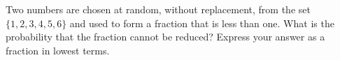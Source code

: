 Two numbers are chosen at random, without replacement, from the set $\{1,2,3,4,5,6\}$ and used to form a fraction that is less than one. What is the probability that the fraction cannot be reduced? Express your answer as a fraction in lowest terms.
